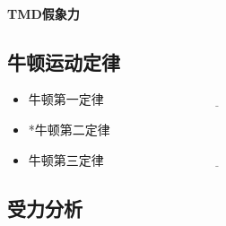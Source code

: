 \documentclass[a4paper, 11pt, oneside]{article}
\begin{document}
\paragraph{TMD假象力}
\subsection{牛顿运动定律}
\begin{itemize}
	\item 牛顿第一定律$\underline{\quad\quad\quad\quad\quad\quad\quad\quad\quad\quad\quad\quad\quad\quad\quad\quad\quad\quad}$
	\item *牛顿第二定律
	\item 牛顿第三定律$\underline{\quad\quad\quad\quad\quad\quad\quad\quad\quad\quad\quad\quad\quad\quad\quad\quad\quad\quad}$
\end{itemize}
\subsection{受力分析}
\end{document}

